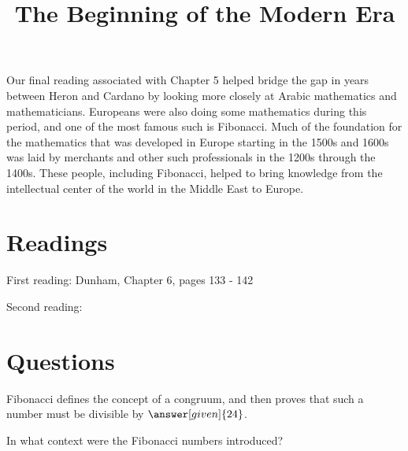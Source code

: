 \documentclass[nooutcomes]{ximera}
\title{The Beginning of the Modern Era}
\begin{document}
\begin{abstract}
    
\end{abstract}
\maketitle

Our final reading associated with Chapter 5 helped bridge the gap in years between Heron and Cardano by looking more 
closely at Arabic mathematics and mathematicians.  Europeans were also doing some mathematics during this period, and 
one of the most famous such is Fibonacci.  Much of the foundation for the mathematics that was developed in Europe 
starting in the 1500s and 1600s was laid by merchants and other such professionals in the 1200s through the 1400s.  
These people, including Fibonacci, helped to bring knowledge from the intellectual center of the world in the Middle 
East to Europe.


\section{Readings}
First reading: Dunham, Chapter 6, pages 133 - 142

Second reading: 



\section{Questions}

\begin{question}
Fibonacci defines the concept of a congruum, and then proves that such a number must be divisible by $\answer[given]{24}$.
\end{question}

\begin{question}
In what context were the Fibonacci numbers introduced?
\begin{multipleChoice}
\end{multipleChoice}
\end{question}


%
\end{document}
